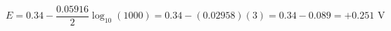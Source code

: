 \documentclass[preview]{standalone}
\begin{document}
\[E = 0.34 - \frac{0.05916}{2} \log_{10}(1000) = 0.34 - (0.02958)(3) = 0.34 - 0.089 = +0.251 \text{ V}\]
\end{document}
